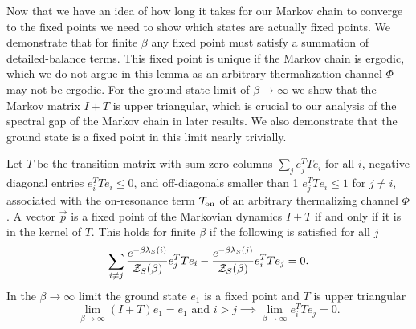 Now that we have an idea of how long it takes for our Markov chain to converge to the fixed points we need to show which states are actually fixed points. We demonstrate that for finite $\beta$ any fixed point must satisfy a summation of detailed-balance terms. This fixed point is unique if the Markov chain is ergodic, which we do not argue in this lemma as an arbitrary thermalization channel $\Phi$ may not be ergodic. For the ground state limit of $\beta \to \infty$ we show that the Markov matrix $I + T$ is upper triangular, which is crucial to our analysis of the spectral gap of the Markov chain in later results. We also demonstrate that the ground state is a fixed point in this limit nearly trivially.
\begin{lemma}\label{lem:fixed_point}
    Let $T$ be the transition matrix with sum zero columns $\sum_j e_j^T T e_i$ for all $i$, negative diagonal entries $e_i^T T e_i \leq 0$, and off-diagonals smaller than 1 $e_j^T T e_i \leq 1$ for $j \neq i$, associated with the on-resonance term $\mathcal{T}_{\rm on}$ of an arbitrary thermalizing channel $\Phi$. A vector $\vec{p}$ is a fixed point of the Markovian dynamics $I + T$ if and only if it is in the kernel of $T$. This holds for finite $\beta$ if the following is satisfied for all $j$
    \begin{equation}
        \sum_{i \neq j} \frac{e^{-\beta \lambda_S(i)}}{\mathcal{Z}_S(\beta)} e_j^T T e_i - \frac{e^{-\beta \lambda_S(j)}}{\mathcal{Z}_S(\beta)} e_i^T T e_j = 0.\label{eq:detailed_balance}
    \end{equation}
    In the $\beta \to \infty$ limit the ground state $e_1$ is a fixed point and $T$ is upper triangular
    \begin{equation}
        \lim_{\beta \to \infty} (I + T) e_1 = e_1 \text{ and }i > j \implies \lim_{\beta \to \infty} e_i^T T e_j = 0.
    \end{equation}
\end{lemma}
